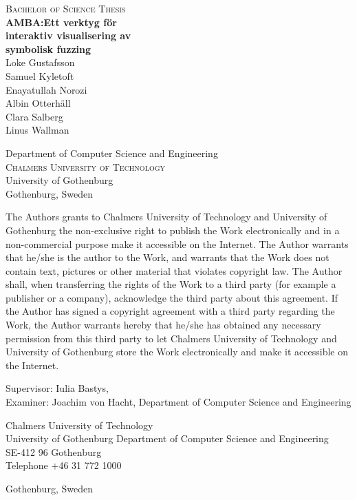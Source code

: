 \newpage
\thispagestyle{empty}
\begin{center}

    \textsc{\large Bachelor of Science Thesis }\\[4cm]

    \textbf{\Large AMBA:\@ Ett verktyg för \\ interaktiv visualisering av \\ symbolisk fuzzing} \\[1cm]
    {\large Loke Gustafsson} \\
    {\large Samuel Kyletoft} \\
    {\large Enayatullah Norozi} \\
    {\large Albin Otterhäll} \\
    {\large Clara Salberg} \\
    {\large Linus Wallman} \\

    \vfill

    Department of Computer Science and Engineering\\
    \textsc{Chalmers University of Technology} \\
    {\small University of Gothenburg} \\
    Gothenburg, Sweden \the\year{} \\
\end{center}


\newpage
{The Authors grants to Chalmers University of Technology and University of Gothenburg the
    non-exclusive right to publish the Work electronically and in a non-commercial purpose make it
    accessible on the Internet. The Author warrants that he/she is the author to the Work, and
    warrants that the Work does not contain text, pictures or other material that violates
    copyright law.
    The Author shall, when transferring the rights of the Work to a third party (for example a
    publisher or a company), acknowledge the third party about this agreement. If the Author has
    signed a copyright agreement with a third party regarding the Work, the Author warrants
    hereby that he/she has obtained any necessary permission from this third party to let Chalmers
    University of Technology and University of Gothenburg store the Work electronically and make
    it accessible on the Internet.}

Supervisor: Iulia Bastys, \\
Examiner: Joachim von Hacht, Department of Computer Science and Engineering\setlength{\parskip}{1cm}

Chalmers University of Technology\\
University of Gothenburg
Department of Computer Science and Engineering \\
SE-412 96 Gothenburg\\
Telephone +46 31 772 1000 \setlength{\parskip}{0.5cm}

\vfill
Gothenburg, Sweden \the\year{}
